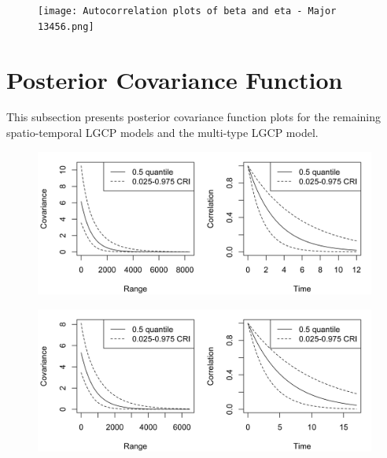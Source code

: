\begin{appendices}
    \begin{figure}[H]
        \begin{center}
            \texttt{[image: Autocorrelation plots of beta and eta - Major 13456.png]}
        \end{center}
    \end{figure}

\newpage

\section{Posterior Covariance Function} \label{app:covariance-function}

    This subsection presents posterior covariance function plots for the remaining spatio-temporal LGCP models and the multi-type LGCP model.

    \begin{figure}[H]
        \begin{center}
            \includegraphics[width=\linewidth]{Posterior Covariance Function - Major 2.png}
        \end{center}
    \end{figure}

    \begin{figure}[H]
        \begin{center}
            \includegraphics[width=\linewidth]{Posterior Covariance Function - Major 13456.png}
        \end{center}
    \end{figure}


\end{appendices}
